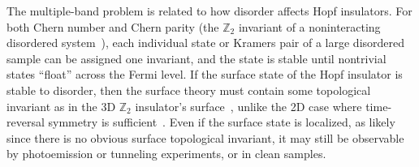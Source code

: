 \documentclass[prl,showpacs,superscriptaddress,twocolumn,preprintnumbers,amssymb,amsfonts]{revtex4}
\begin{document}

The multiple-band problem is related to how disorder affects Hopf insulators.  For both Chern number and Chern parity (the $\mathbb{Z}_2$ invariant of a noninteracting disordered system~\cite{essinmoore}), each individual state or Kramers pair of a large disordered sample can be assigned one invariant, and the state is stable until nontrivial states ``float'' across the Fermi level.  If the surface state of the Hopf insulator is stable to disorder, then the surface theory must contain some topological invariant as in the 3D $\mathbb{Z}_2$ insulator's surface~\cite{ryu&alii-2007,ostrovskymirlin}, unlike the 2D case where time-reversal symmetry is sufficient~\cite{xumooreedge,congjun}.  Even if the surface state is localized, as likely since there is no obvious surface topological invariant, it may still be observable by photoemission or tunneling experiments, or in clean samples.


\end{document}
